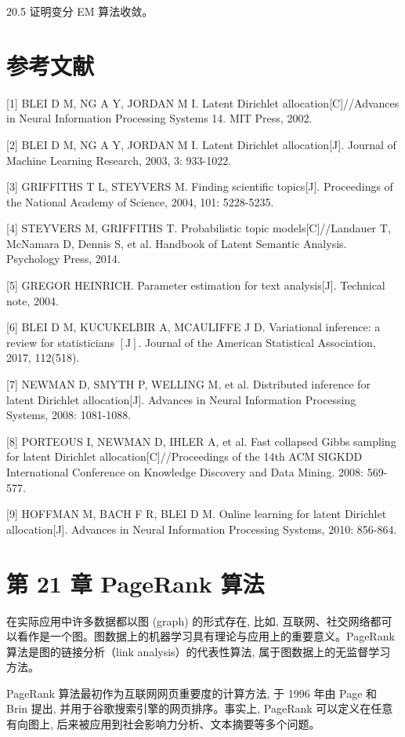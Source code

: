 \documentclass[10pt]{article}
\begin{document}
\begin{CJK*}{UTF8}{bsmi}
20.5 证明变分 EM 算法收敛。

\section*{参考文献}
[1] BLEI D M, NG A Y, JORDAN M I. Latent Dirichlet allocation[C]//Advances in Neural Information Processing Systems 14. MIT Press, 2002.

[2] BLEI D M, NG A Y, JORDAN M I. Latent Dirichlet allocation[J]. Journal of Machine Learning Research, 2003, 3: 933-1022.

[3] GRIFFITHS T L, STEYVERS M. Finding scientific topics[J]. Proceedings of the National Academy of Science, 2004, 101: 5228-5235.

[4] STEYVERS M, GRIFFITHS T. Probabilistic topic models[C]//Landauer T, McNamara D, Dennis S, et al. Handbook of Latent Semantic Analysis. Psychology Press, 2014.

[5] GREGOR HEINRICH. Parameter estimation for text analysis[J]. Technical note, 2004.

[6] BLEI D M, KUCUKELBIR A, MCAULIFFE J D. Variational inference: a review for statisticians $[\mathrm{J}]$. Journal of the American Statistical Association, 2017, 112(518).

[7] NEWMAN D, SMYTH P, WELLING M, et al. Distributed inference for latent Dirichlet allocation[J]. Advances in Neural Information Processing Systems, 2008: 1081-1088.

[8] PORTEOUS I, NEWMAN D, IHLER A, et al. Fast collapsed Gibbs sampling for latent Dirichlet allocation[C]//Proceedings of the 14th ACM SIGKDD International Conference on Knowledge Discovery and Data Mining. 2008: 569-577.

[9] HOFFMAN M, BACH F R, BLEI D M. Online learning for latent Dirichlet allocation[J]. Advances in Neural Information Processing Systems, 2010: 856-864.

\section*{第 21 章 PageRank 算法}
在实际应用中许多数据都以图 (graph) 的形式存在, 比如, 互联网、社交网络都可以看作是一个图。图数据上的机器学习具有理论与应用上的重要意义。PageRank 算法是图的链接分析（link analysis）的代表性算法, 属于图数据上的无监督学习方法。

PageRank 算法最初作为互联网网页重要度的计算方法, 于 1996 年由 Page 和 Brin 提出, 并用于谷歌搜索引擎的网页排序。事实上, PageRank 可以定义在任意有向图上, 后来被应用到社会影响力分析、文本摘要等多个问题。


\end{CJK*}
\end{document}
